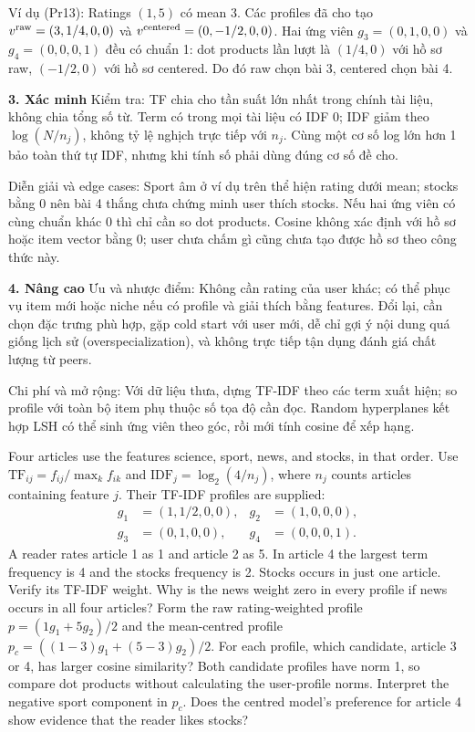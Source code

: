 \documentclass[10pt,a4paper,twocolumn]{article}
\newcommand{\key}[1]{#1:\enspace}
\newcommand{\unitheading}[2]{%
  \par\addvspace{1pt}\noindent\textbf{#1. #2}\enspace}
\newcommand{\unitverification}{\unitheading{3}{Xác minh}}
\newcommand{\unitadvanced}{\unitheading{4}{Nâng cao}}
\begin{document}
\key{Ví dụ (Pr13)} Ratings $(1,5)$ có mean 3. Các profiles đã cho tạo $v^{\rm raw}=(3,1/4,0,0)$ và $v^{\rm centered}=(0,-1/2,0,0)$. Hai ứng viên $g_3=(0,1,0,0)$ và $g_4=(0,0,0,1)$ đều có chuẩn 1: dot products lần lượt là $(1/4,0)$ với hồ sơ raw, $(-1/2,0)$ với hồ sơ centered. Do đó raw chọn bài 3, centered chọn bài 4.

\unitverification
\key{Kiểm tra} TF chia cho tần suất lớn nhất trong chính tài liệu, không chia tổng số từ. Term có trong mọi tài liệu có IDF 0; IDF giảm theo $\log(N/n_j)$, không tỷ lệ nghịch trực tiếp với $n_j$. Cùng một cơ số log lớn hơn 1 bảo toàn thứ tự IDF, nhưng khi tính số phải dùng đúng cơ số đề cho.

\key{Diễn giải và edge cases} Sport âm ở ví dụ trên thể hiện rating dưới mean; stocks bằng 0 nên bài 4 thắng chưa chứng minh user thích stocks. Nếu hai ứng viên có cùng chuẩn khác 0 thì chỉ cần so dot products. Cosine không xác định với hồ sơ hoặc item vector bằng 0; user chưa chấm gì cũng chưa tạo được hồ sơ theo công thức này.

\unitadvanced
\key{Ưu và nhược điểm} Không cần rating của user khác; có thể phục vụ item mới hoặc niche nếu có profile và giải thích bằng features. Đổi lại, cần chọn đặc trưng phù hợp, gặp cold start với user mới, dễ chỉ gợi ý nội dung quá giống lịch sử (overspecialization), và không trực tiếp tận dụng đánh giá chất lượng từ peers.

\key{Chi phí và mở rộng} Với dữ liệu thưa, dựng TF-IDF theo các term xuất hiện; so profile với toàn bộ item phụ thuộc số tọa độ cần đọc. Random hyperplanes kết hợp LSH có thể sinh ứng viên theo góc, rồi mới tính cosine để xếp hạng.


Four articles use the features science, sport, news, and stocks, in that order. Use $\mathrm{TF}_{ij}=f_{ij}/\max_k f_{ik}$ and $\mathrm{IDF}_j=\log_2(4/n_j)$, where $n_j$ counts articles containing feature $j$. Their TF-IDF profiles are supplied:
\[
\begin{aligned}
g_1&=(1,1/2,0,0), &g_2&=(1,0,0,0),\\
g_3&=(0,1,0,0), &g_4&=(0,0,0,1).
\end{aligned}
\]
A reader rates article 1 as 1 and article 2 as 5.
 In article 4 the largest term frequency is 4 and the stocks frequency is 2. Stocks occurs in just one article. Verify its TF-IDF weight. Why is the news weight zero in every profile if news occurs in all four articles?
 Form the raw rating-weighted profile $p=(1g_1+5g_2)/2$ and the mean-centred profile $p_c=((1-3)g_1+(5-3)g_2)/2$. For each profile, which candidate, article 3 or 4, has larger cosine similarity? Both candidate profiles have norm 1, so compare dot products without calculating the user-profile norms.
 Interpret the negative sport component in $p_c$. Does the centred model's preference for article 4 show evidence that the reader likes stocks?
\end{document}
